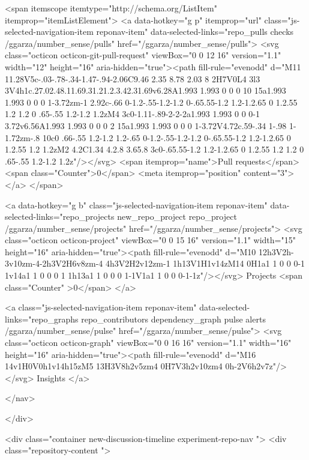   <span itemscope itemtype="http://schema.org/ListItem" itemprop="itemListElement">
    <a data-hotkey="g p" itemprop="url" class="js-selected-navigation-item reponav-item" data-selected-links="repo_pulls checks /ggarza/number_sense/pulls" href="/ggarza/number_sense/pulls">
      <svg class="octicon octicon-git-pull-request" viewBox="0 0 12 16" version="1.1" width="12" height="16" aria-hidden="true"><path fill-rule="evenodd" d="M11 11.28V5c-.03-.78-.34-1.47-.94-2.06C9.46 2.35 8.78 2.03 8 2H7V0L4 3l3 3V4h1c.27.02.48.11.69.31.21.2.3.42.31.69v6.28A1.993 1.993 0 0 0 10 15a1.993 1.993 0 0 0 1-3.72zm-1 2.92c-.66 0-1.2-.55-1.2-1.2 0-.65.55-1.2 1.2-1.2.65 0 1.2.55 1.2 1.2 0 .65-.55 1.2-1.2 1.2zM4 3c0-1.11-.89-2-2-2a1.993 1.993 0 0 0-1 3.72v6.56A1.993 1.993 0 0 0 2 15a1.993 1.993 0 0 0 1-3.72V4.72c.59-.34 1-.98 1-1.72zm-.8 10c0 .66-.55 1.2-1.2 1.2-.65 0-1.2-.55-1.2-1.2 0-.65.55-1.2 1.2-1.2.65 0 1.2.55 1.2 1.2zM2 4.2C1.34 4.2.8 3.65.8 3c0-.65.55-1.2 1.2-1.2.65 0 1.2.55 1.2 1.2 0 .65-.55 1.2-1.2 1.2z"/></svg>
      <span itemprop="name">Pull requests</span>
      <span class="Counter">0</span>
      <meta itemprop="position" content="3">
</a>  </span>


    <a data-hotkey="g b" class="js-selected-navigation-item reponav-item" data-selected-links="repo_projects new_repo_project repo_project /ggarza/number_sense/projects" href="/ggarza/number_sense/projects">
      <svg class="octicon octicon-project" viewBox="0 0 15 16" version="1.1" width="15" height="16" aria-hidden="true"><path fill-rule="evenodd" d="M10 12h3V2h-3v10zm-4-2h3V2H6v8zm-4 4h3V2H2v12zm-1 1h13V1H1v14zM14 0H1a1 1 0 0 0-1 1v14a1 1 0 0 0 1 1h13a1 1 0 0 0 1-1V1a1 1 0 0 0-1-1z"/></svg>
      Projects
      <span class="Counter" >0</span>
</a>


  <a class="js-selected-navigation-item reponav-item" data-selected-links="repo_graphs repo_contributors dependency_graph pulse alerts /ggarza/number_sense/pulse" href="/ggarza/number_sense/pulse">
    <svg class="octicon octicon-graph" viewBox="0 0 16 16" version="1.1" width="16" height="16" aria-hidden="true"><path fill-rule="evenodd" d="M16 14v1H0V0h1v14h15zM5 13H3V8h2v5zm4 0H7V3h2v10zm4 0h-2V6h2v7z"/></svg>
    Insights
</a>

</nav>


  </div>

<div class="container new-discussion-timeline experiment-repo-nav  ">
  <div class="repository-content ">

